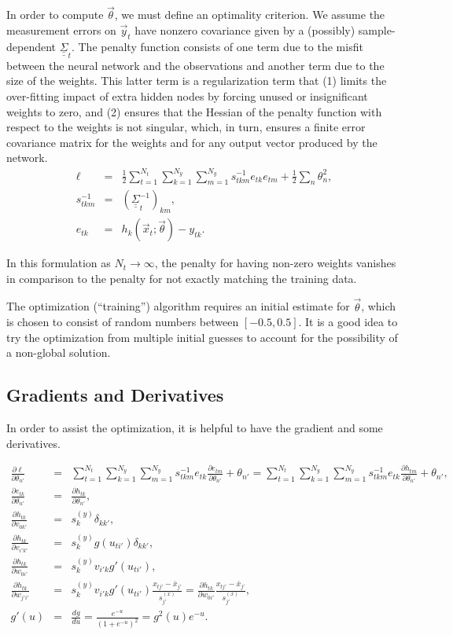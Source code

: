 \documentclass{article}    %
\newcommand{\dbul}[1]{\underline{\underline{#1}}}
\begin{document}
In order to compute $\vec\theta$, we must define an optimality
criterion. We assume the measurement errors on $\vec{y}_t$ have
nonzero covariance given by a (possibly) sample-dependent
$\dbul{\Sigma}_t$. The penalty function consists of one term due to
the misfit between the neural network and the observations and
another term due to the size of the weights. This latter term is a
regularization term that (1) limits the over-fitting impact of extra
hidden nodes by forcing unused or insignificant weights to zero, and
(2) ensures that the Hessian of the penalty function with respect to
the weights is not singular, which, in turn, ensures a finite error
covariance matrix for the weights and for any output vector produced
by the network.
\begin{eqnarray}
\ell &=& \frac{1}{2}\sum_{t=1}^{N_t}\sum_{k=1}^{N_y}\sum_{m=1}^{N_y}s^{-1}_{tkm}e_{tk}e_{tm} + \frac{1}{2}\sum_n \theta^2_n,  \\
s^{-1}_{tkm} &=& \left(\dbul{\Sigma}^{-1}_t\right)_{km}, \\
e_{tk} &=& h_{k}(\vec{x}_t;\vec\theta)-y_{tk}.
\end{eqnarray}

In this formulation as $N_t\rightarrow\infty$, the penalty for having
non-zero weights vanishes in comparison to the penalty for not exactly
matching the training data.

The optimization (``training'') algorithm requires an initial estimate
for $\vec\theta$, which is chosen to consist of random numbers between
$[-0.5,0.5]$.  It is a good idea to try the optimization from multiple
initial guesses to account for the possibility of a non-global
solution.

\subsection{Gradients and Derivatives}
In order to assist the optimization, it is helpful to have the
gradient and some derivatives.

\begin{eqnarray}
\frac{\partial\ell}{\partial \theta_{n'}} 
&=& \sum_{t=1}^{N_t}\sum_{k=1}^{N_y}\sum_{m=1}^{N_y} s^{-1}_{tkm}e_{tk}\frac{\partial e_{tm}}{\partial\theta_{n'}} + \theta_{n'}
= \sum_{t=1}^{N_t}\sum_{k=1}^{N_y} \sum_{m=1}^{N_y} s^{-1}_{tkm}e_{tk}\frac{\partial h_{tm}}{\partial\theta_{n'}} + \theta_{n'}, \\
\frac{\partial e_{tk}}{\partial\theta_{n'}} &=& \frac{\partial h_{tk}}{\partial\theta_{n'}}, \\
\frac{\partial h_{tk}}{\partial v_{0k'}} &=& s^{(y)}_k \delta_{kk'}, \\
\frac{\partial h_{tk}}{\partial v_{i'k'}} &=& s^{(y)}_k g(u_{ti'})\delta_{kk'},\\
\frac{\partial h_{tk}}{\partial w_{0i'}} &=& s^{(y)}_k v_{i'k} g'(u_{ti'}),\\
\frac{\partial h_{tk}}{\partial w_{j'i'}} &=& s^{(y)}_k v_{i'k} g'(u_{ti'}) \frac{x_{tj'}-\bar{x}_{j'}}{s^{(x)}_{j'}} = \frac{\partial h_{tk}}{\partial w_{0i'}}\frac{x_{tj'}-\bar{x}_{j'}}{s^{(x)}_{j'}}, \\
g'(u) &=& \frac{dg}{du} = \frac{e^{-u}}{\left(1+e^{-u}\right)^2} = g^2(u) e^{-u}.
\end{eqnarray}
\end{document}
